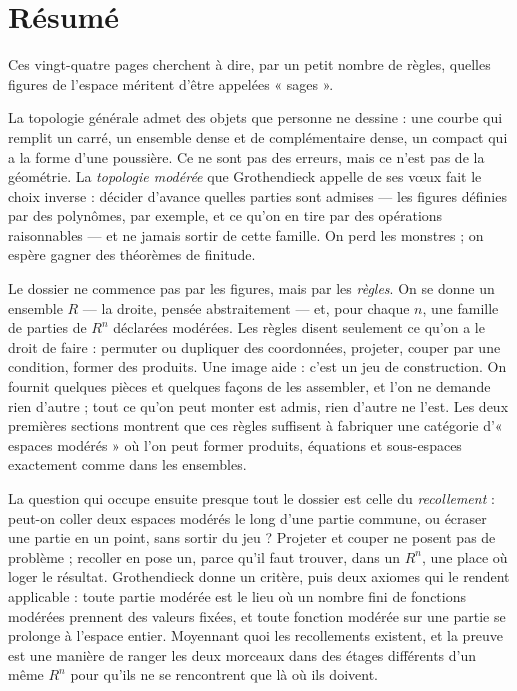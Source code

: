 \documentclass[11pt,a4paper]{article}
\begin{document}
\section*{Résumé}

\begin{resume}
Ces vingt-quatre pages cherchent à dire, par un petit nombre de règles,
quelles figures de l'espace méritent d'être appelées « sages ».

La topologie générale admet des objets que personne ne dessine : une courbe
qui remplit un carré, un ensemble dense et de complémentaire dense, un compact
qui a la forme d'une poussière. Ce ne sont pas des erreurs, mais ce n'est pas
de la géométrie. La \emph{topologie modérée} que Grothendieck appelle de ses
vœux fait le choix inverse : décider d'avance quelles parties sont admises —
les figures définies par des polynômes, par exemple, et ce qu'on en tire par
des opérations raisonnables — et ne jamais sortir de cette famille. On perd les
monstres ; on espère gagner des théorèmes de finitude.

Le dossier ne commence pas par les figures, mais par les \emph{règles}. On se
donne un ensemble $R$ — la droite, pensée abstraitement — et, pour chaque
$n$, une famille de parties de $R^n$ déclarées modérées. Les règles disent
seulement ce qu'on a le droit de faire : permuter ou dupliquer des
coordonnées, projeter, couper par une condition, former des produits. Une
image aide : c'est un jeu de construction. On fournit quelques pièces et
quelques façons de les assembler, et l'on ne demande rien d'autre ; tout ce
qu'on peut monter est admis, rien d'autre ne l'est. Les deux premières
sections montrent que ces règles suffisent à fabriquer une catégorie
d'« espaces modérés » où l'on peut former produits, équations et
sous-espaces exactement comme dans les ensembles.

La question qui occupe ensuite presque tout le dossier est celle du
\emph{recollement} : peut-on coller deux espaces modérés le long d'une partie
commune, ou écraser une partie en un point, sans sortir du jeu ? Projeter et
couper ne posent pas de problème ; recoller en pose un, parce qu'il faut
trouver, dans un $R^n$, une place où loger le résultat. Grothendieck donne un
critère, puis deux axiomes qui le rendent applicable : toute partie modérée
est le lieu où un nombre fini de fonctions modérées prennent des valeurs
fixées, et toute fonction modérée sur une partie se prolonge à l'espace
entier. Moyennant quoi les recollements existent, et la preuve est une
manière de ranger les deux morceaux dans des étages différents d'un même
$R^n$ pour qu'ils ne se rencontrent que là où ils doivent.


\end{resume}
\end{document}
